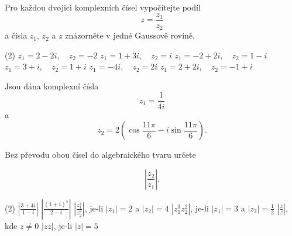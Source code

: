 \documentclass[12pt,a4paper]{article}
\begin{document}
\begin{exercise}
    Pro každou dvojici komplexních čísel vypočítejte podíl
    \[
        z=\frac{z_1}{z_2}
    \]
    a čísla $z_1$, $z_2$ a $z$ znázorněte v jedné Gaussově rovině.

        \begin{tasks}(2)
            \task $z_1=2-2i,\quad z_2=-2$
            \task $z_1=1+3i,\quad z_2=i$
            \task $z_1=-2+2i,\quad z_2=1-i$
            \task $z_1=3+i,\quad z_2=1+i$
            \task $z_1=-4i,\quad z_2=2i$
            \task $z_1=2+2i,\quad z_2=-1+i$
        \end{tasks}
\end{exercise}


\begin{exercise}
    Jsou dána komplexní čísla
    \[
        z_1=\frac{1}{4i}
    \]
    a
    \[
        z_2=
        2\left(
            \cos\frac{11\pi}{6}
            -
            i\sin\frac{11\pi}{6}
        \right).
    \]
    
    Bez převodu obou čísel do algebraického tvaru určete
    
    \[
        \left|\frac{z_2}{z_1}\right|.
    \]
\end{exercise}


\begin{exercise}
    \begin{tasks}(2)
        \task $\displaystyle \left|\frac{3+4i}{1-i}\right|$
        \task $\displaystyle \left|\frac{(1+i)^5}{2-i}\right|$
        \task $\displaystyle \left|\frac{z_1^4}{z_2^3}\right|$, je-li $|z_1|=2$ a $|z_2|=4$
        \task $\displaystyle |z_1^3z_2^2|$, je-li $|z_1|=3$ a $|z_2|=\frac12$
        \task $\displaystyle \left|\frac{\overline z}{z}\right|$, kde $z\neq0$
        \task $\displaystyle |z\overline z|$, je-li $|z|=5$
    \end{tasks}
\end{exercise}
\end{document}
